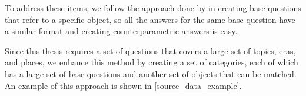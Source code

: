 To address these items, we follow the approach done by \citeauthor{factual_recall} in creating base questions that refer to a specific object, so all the answers for the same base question have a similar format and creating counterparametric answers is easy.

Since this thesis requires a set of questions that covers a large set of topics, eras, and places, we enhance this method by creating a set of categories, each of which has a large set of base questions and another set of objects that can be matched.
An example of this approach is shown in \cref{source_data_example}.

\begin{table}[ht]
	\setlength{\fboxsep}{0pt}
	\setlength{\fboxrule}{1pt}
	\newcommand{\rep}[1]{{\setlength{\fboxsep}{0pt}\fcolorbox{Gray}{Gray!80}{\textit{#1}}}}


\end{table}
